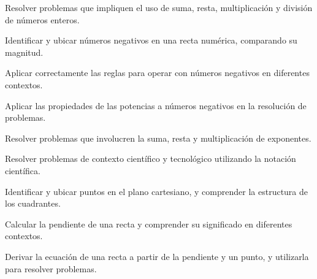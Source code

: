 \item Resolver problemas que impliquen el uso de suma, resta, multiplicación y división de números enteros.
\item Identificar y ubicar números negativos en una recta numérica, comparando su magnitud.
\item Aplicar correctamente las reglas para operar con números negativos en diferentes contextos.
\item Aplicar las propiedades de las potencias a números negativos en la resolución de problemas.
\item Resolver problemas que involucren la suma, resta y multiplicación de exponentes.
\item Resolver problemas de contexto científico y tecnológico utilizando la notación científica.
\item Identificar y ubicar puntos en el plano cartesiano, y comprender la estructura de los cuadrantes.
\item Calcular la pendiente de una recta y comprender su significado en diferentes contextos.
\item Derivar la ecuación de una recta a partir de la pendiente y un punto, y utilizarla para resolver problemas.